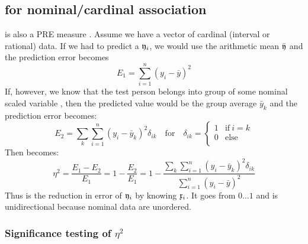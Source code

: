 \begin{refsection}
\subsection{ for nominal/cardinal association}

 is also a PRE measure \parencite{Ano-16}. Assume we have a vector  of cardinal (interval or rational) data. If we had to predict a \(\mathfrak{y}_i \), we would use the arithmetic mean \(\bar{\mathfrak{y}} \) and the prediction error becomes
\begin{equation}
  E_1 = \sum_{i=1}^n{(y_i - \bar{y})^2}
\end{equation}
If, however, we know that the test person  belongs into group  of some nominal scaled variable , then the predicted value would be the group average \(\bar{y}_k \) and the prediction error becomes:
\begin{equation}
  E_2 = \sum_k{\sum_{i=1}^n{(y_i - \bar{y}_k)^2 \delta_{ik}}} \quad \mathrm{for}\quad \delta_{ik} = \left\{
                                                                           \begin{array}{rl}
                                                                              1 & \mathrm{if}\ i = k \\
                                                                              0 & \mathrm{else} \\
                                                                           \end{array}
                                                                          \right.
\end{equation}
Then  becomes:
\begin{equation}
  \eta^2 = \frac{E_1 - E_2}{E_1} = 1 - \frac{E_2}{E_1}= 1 - \frac{\sum_k{\sum_{i=1}^n{(y_i - \bar{y}_k)^2 \delta_{ik}}}}{\sum_{i=1}^n{(y_i - \bar{y})^2}}
\end{equation}
Thus  is the reduction in error of \(\mathfrak{y}_i \) by knowing \(\mathfrak{x}_i \). It goes from \(0\ldots 1 \) and is unidirectional because nominal data are unordered.

\subsubsection{Significance testing of \(\eta^2 \)}


\end{refsection}
